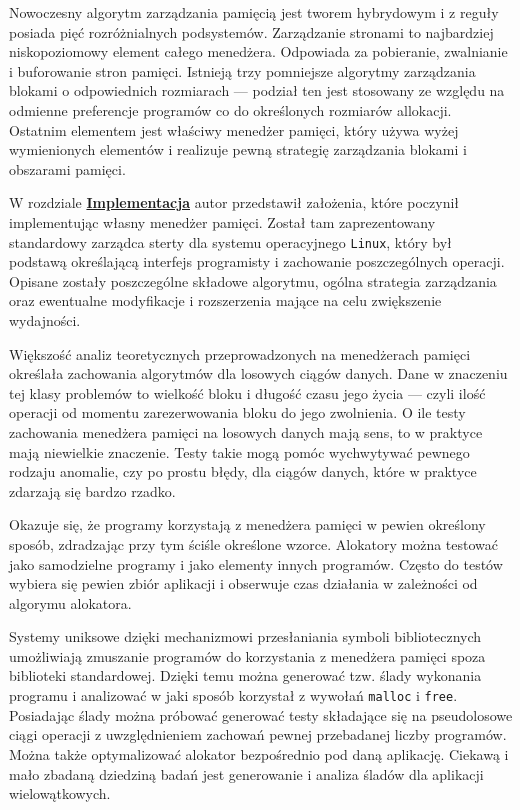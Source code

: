 \documentclass[12pt,a4paper,titlepage,twoside]{mwart}
\begin{document}
Nowoczesny algorytm zarządzania pamięcią jest tworem hybrydowym i z reguły
posiada pięć rozróżnialnych podsystemów. Zarządzanie stronami to najbardziej
niskopoziomowy element całego menedżera. Odpowiada za pobieranie, zwalnianie i
buforowanie stron pamięci. Istnieją trzy pomniejsze algorytmy zarządzania
blokami o odpowiednich rozmiarach --- podział ten jest stosowany ze względu na
odmienne preferencje programów co do określonych rozmiarów allokacji. Ostatnim
elementem jest właściwy menedżer pamięci, który używa wyżej wymienionych
elementów i realizuje pewną strategię zarządzania blokami i obszarami pamięci.

W rozdziale \hyperlink{Implementacja}{\textbf{Implementacja}} autor przedstawił
założenia, które poczynił implementując własny menedżer pamięci. Został tam
zaprezentowany standardowy zarządca sterty dla systemu operacyjnego
\texttt{Linux}, który był podstawą określającą interfejs programisty i
zachowanie poszczególnych operacji. Opisane zostały poszczególne składowe
algorytmu, ogólna strategia zarządzania oraz ewentualne modyfikacje i
rozszerzenia mające na celu zwiększenie wydajności.

Większość analiz teoretycznych przeprowadzonych na menedżerach pamięci
określała zachowania algorytmów dla losowych ciągów danych. Dane w znaczeniu
tej klasy problemów to wielkość bloku i długość czasu jego życia --- czyli ilość
operacji od momentu zarezerwowania bloku do jego zwolnienia. O ile testy
zachowania menedżera pamięci na losowych danych mają sens, to w praktyce mają
niewielkie znaczenie. Testy takie mogą pomóc wychwytywać pewnego rodzaju
anomalie, czy po prostu błędy, dla ciągów danych, które w praktyce zdarzają się
bardzo rzadko.

Okazuje się, że programy korzystają z menedżera pamięci w pewien określony
sposób, zdradzając przy tym ściśle określone wzorce. Alokatory można testować
jako samodzielne programy i jako elementy innych programów. Często do testów
wybiera się pewien zbiór aplikacji i obserwuje czas działania w zależności od
algorymu alokatora.

Systemy uniksowe dzięki mechanizmowi przesłaniania symboli bibliotecznych
umożliwiają zmuszanie programów do korzystania z menedżera pamięci spoza
biblioteki standardowej. Dzięki temu można generować tzw. ślady wykonania
programu i analizować w jaki sposób korzystał z wywołań \texttt{malloc} i
\texttt{free}. Posiadając ślady można próbować generować testy składające się
na pseudolosowe ciągi operacji z uwzględnieniem zachowań pewnej przebadanej
liczby programów. Można także optymalizować alokator bezpośrednio pod daną
aplikację. Ciekawą i mało zbadaną dziedziną badań jest generowanie i analiza
śladów dla aplikacji wielowątkowych.
\end{document}
